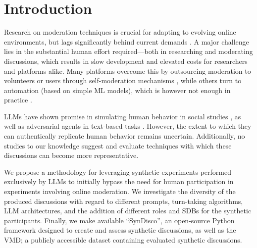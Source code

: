 %

\section{Introduction}
\label{sec:introduction}


Research on moderation techniques is crucial for adapting to evolving online environments, but lags significantly behind current demands \cite{seering_self_moderation, make_reddit_great}. A major challenge lies in the substantial human effort required—both in researching and moderating discussions, which results in slow development and elevated costs for researchers and platforms alike. Many platforms overcome this by outsourcing moderation to volunteers or users through self-moderation mechanisms \cite{Matias2019TheCL, schaffner_community_guidelines}, while others turn to automation (based on simple \ac{ML} models), which is however not enough in practice \cite{horta_automated_moderation, schaffner_community_guidelines}.

\acfp{LLM} have shown promise in simulating human behavior in social studies \cite{park2024generativeagentsimulations1000, hewitt2024predicting, Park2023GenerativeAI}, as well as adversarial agents in text-based tasks \cite{cheng2024selfplayingadversariallanguagegame}. However, the extent to which they can authentically replicate human behavior remains uncertain. Additionally, no studies to our knowledge suggest and evaluate techniques with which these discussions can become more representative.

We propose a methodology for leveraging synthetic experiments performed exclusively by \acp{LLM} to initially bypass the need for human participation in experiments involving online moderation. We investigate the diversity of the produced discussions with regard to different prompts, turn-taking algorithms, \ac{LLM} architectures, and the addition of different roles and \acp{SDB} for the synthetic participants. Finally, we make available “SynDisco”, an open-source Python framework designed to create and assess synthetic discussions, as well as the \ac{VMD}; a publicly accessible dataset containing evaluated synthetic discussions. 